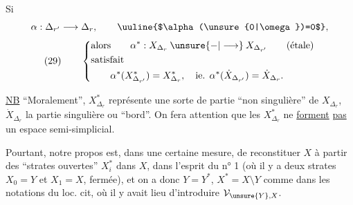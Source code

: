 Si
\[
\alpha:\Delta_{r'}\longrightarrow\Delta_r,\qquad \uuline{$\alpha(\unsure{0|\omega})=0$},
\]
\[
(29)\qquad\left\{\begin{aligned}
&\text{alors}\qquad \alpha^*:X_{\Delta_r}\mathbin{\unsure{-|\longrightarrow}}X_{\Delta_{r'}}\qquad(\text{étale})\\
&\text{satisfait}\\
&\qquad\alpha^*(X_{\Delta_{r'}}^*)=X_{\Delta_r}^*,\quad\text{ie. }\alpha^*(\dot X_{\Delta_{r'}})=\dot X_{\Delta_r}.
\end{aligned}\right.
\]


\uline{NB} ``Moralement'', $X_{\Delta_r}^*$ représente une sorte de partie ``non singulière'' de $X_{\Delta_r}$, $\dot X_{\Delta_r}$ la partie singulière ou ``bord''. On fera attention que les $X_{\Delta_r}^*$ ne \uline{forment} \uline{pas} un espace semi-simplicial.

Pourtant, notre propos est, dans une certaine mesure, de reconstituer $X$ à partir des ``strates ouvertes'' $X_i^*$ dans $X$, dans l'esprit du n° 1 (où il y a deux strates $X_0=Y$ et $X_1=X$,   fermée), et on a donc $Y=Y^*$, $X^*=X\setminus Y$ comme dans les notations du loc. cit, où il y avait lieu d'introduire $\mathcal{V}_{\unsure{Y},X}$.

